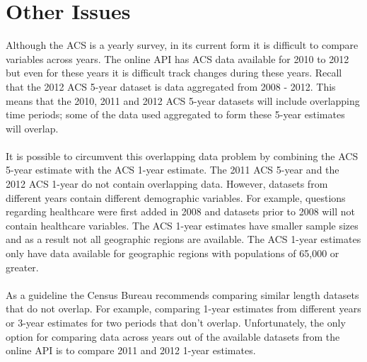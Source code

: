 \documentclass{article}\usepackage[]{graphicx}\usepackage[]{color}
\begin{document}
\section{Other Issues}
Although the ACS is a yearly survey, in its current form it is difficult to compare variables across years.  The online API has ACS data available for 2010 to 2012 but even for these years it is difficult track changes during these years.  Recall that the 2012 ACS 5-year dataset is data aggregated from 2008 - 2012.  This means that the 2010, 2011 and 2012 ACS 5-year datasets will include overlapping time periods; some of the data used aggregated to form these 5-year estimates will overlap.  \\
\\
It is possible to circumvent this overlapping data problem by combining the ACS 5-year estimate with the ACS 1-year estimate.  The 2011 ACS 5-year and the 2012 ACS 1-year do not contain overlapping data.  However, datasets from different years contain different demographic variables.  For example, questions regarding healthcare were first added in 2008 and datasets prior to 2008 will not contain healthcare variables.  The ACS 1-year estimates have smaller sample sizes and as a result not all geographic regions are available.  The ACS 1-year estimates only have data available for geographic regions with populations of 65,000 or greater.\\
\\
As a guideline the Census Bureau recommends comparing similar length datasets that do not overlap.  For example, comparing 1-year estimates from different years or 3-year estimates for two periods that don't overlap.  Unfortunately, the only option for comparing data across years out of the available datasets from the online API is to compare 2011 and 2012 1-year estimates.
\end{document}
